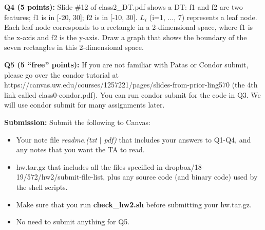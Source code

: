 \documentclass[11pt]{article}
\begin{document}
\vspace{0.7 in}

\hspace{-0.3in}
{\bf Q4 (5 points):} Slide \#12 of class2\_DT.pdf 
shows a DT: f1 and f2 are two features; 
f1 is in [-20, 30]; f2 is in [-10, 30].
$L_i$ (i=1, ..., 7) represents a leaf node.
Each leaf node corresponds to a rectangle in 
a 2-dimensional space, where f1 is the x-axis and f2
is the y-axis. Draw a graph that shows the boundary 
of the seven rectangles in this 2-dimensional space.


\vspace{0.3 in}
\hspace{-0.3in}
{\bf Q5 (5 ``free'' points):} 
    If you are not familiar with Patas or Condor submit, please 
    go over the condor tutorial at
    https://canvas.uw.edu/courses/1257221/pages/slides-from-prior-ling570
    (the 4th link called class0-condor.pdf).
    You can run condor submit for the code in Q3.
    We will use condor submit for many assignments later.
    

\vspace{2in}
\hspace{-0.3in}
{\bf Submission:} Submit the following to Canvas:

\begin{itemize}
  \item Your note file {\it readme.(txt $\mid$ pdf)}
      that includes your answers to Q1-Q4, 
      and any notes that you want the TA to read.

    \item hw.tar.gz that includes all the files specified in
      dropbox/18-19/572/hw2/submit-file-list, plus any source code
      (and binary code) used by the shell scripts.

    \item Make sure that you run {\bf check\_hw2.sh} before
      submitting your hw.tar.gz.

    \item No need to submit anything for Q5.
      
\end{itemize}
\end{document}
